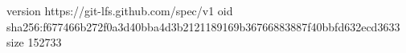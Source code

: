 version https://git-lfs.github.com/spec/v1
oid sha256:f677466b272f0a3d40bba4d3b2121189169b36766883887f40bbfd632ecd3633
size 152733
